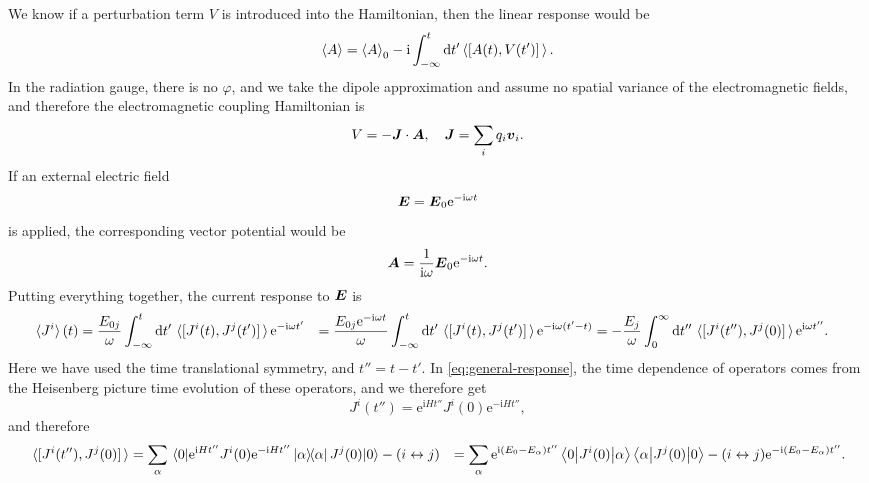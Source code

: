\documentclass[hyperref, a4paper]{article}
\newcommand*{\ii}{\mathrm{i}}
\newcommand*{\ee}{\mathrm{e}}
\def\\{}%
\begin{document}
We know if a perturbation term $V$ is introduced into the Hamiltonian,
then the linear response would be 
\begin{equation}
    \expval{A} = \expval{A}_0 - \ii \int_{-\infty}^{t} \dd{t'} 
    \expval{\comm*{A(t)}{V(t')}}.
    \label{eq:general-response}
\end{equation}
In the radiation gauge, there is no $\varphi$, 
and we take the dipole approximation and assume no spatial variance 
of the electromagnetic fields, 
and therefore the electromagnetic coupling Hamiltonian is 
\begin{equation}
    V = - \vb*{J} \cdot \vb*{A}, \quad 
    \vb*{J} = \sum_i q_i \vb*{v}_i.
    \label{eq:current-potential-coupling}
\end{equation}
If an external electric field 
\begin{equation}
    \vb*{E} = \vb*{E}_0 \ee^{- \ii \omega t} 
\end{equation}
is applied, the corresponding vector potential would be 
\begin{equation}
    \vb*{A} = \frac{1}{\ii \omega} \vb*{E}_0 \ee^{- \ii \omega t}.
\end{equation}
Putting everything together, the current response to $\vb*{E}$ is 
\begin{equation}
    \begin{aligned}
        \expval*{J^i}(t) &= \frac{E_{0j}}{\omega} \int_{-\infty}^{t} \dd{t'} \expval*{\comm*{J^i(t)}{J^j(t')}} \ee^{- \ii \omega t'} \\
        &= \frac{E_{0j} \ee^{- \ii \omega t}}{\omega} 
        \int_{-\infty}^{t} \dd{t'} \expval*{\comm*{J^i(t)}{J^j(t')}} 
        \ee^{- \ii \omega (t' - t)} \\
        &= - \frac{E_j}{\omega} \int_{0}^{\infty} \dd{t''} \expval*{\comm*{J^i(t'')}{J^j(0)}} \ee^{\ii \omega t''}.
    \end{aligned} 
    \label{eq:response-2}
\end{equation}
Here we have used the time translational symmetry, 
and $t'' = t - t'$.
In \eqref{eq:general-response}, 
the time dependence of operators 
comes from the Heisenberg picture time evolution of these operators,
and we therefore get
\[
    J^i(t'') = \ee^{\ii H t''} J^i(0) \ee^{- \ii H t''},
\] 
and therefore 
\[
    \begin{aligned}
        \expval*{\comm*{J^i(t'')}{J^j(0)}} &= 
        \sum_{\alpha} \mel{0}{\ee^{\ii H t''} J^i(0) \ee^{- \ii H t''} \dyad*{\alpha}{\alpha} J^j(0) }{0}
        - (i \leftrightarrow j) \\
        &= \sum_{\alpha} \ee^{\ii (E_0 - E_\alpha) t''}
        \mel**{0}{J^i(0)}{\alpha} \mel**{\alpha}{J^j(0)}{0} - (i \leftrightarrow j)
        \ee^{- \ii (E_0 - E_\alpha) t''}.
    \end{aligned}
\]
\end{document}
